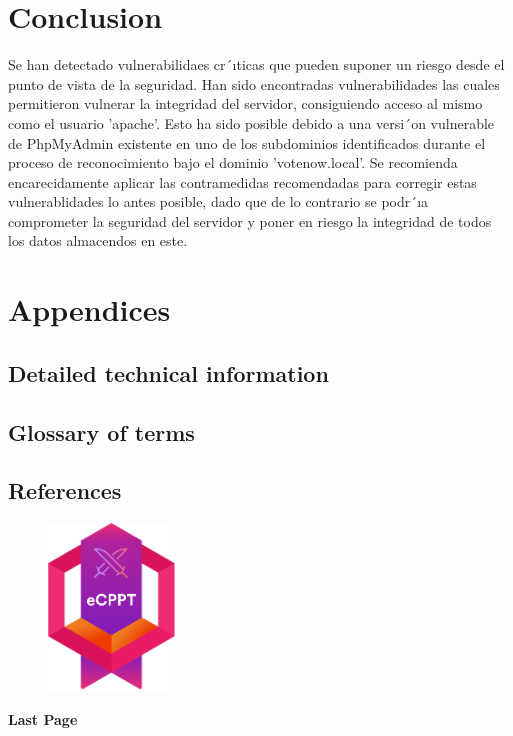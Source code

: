 \documentclass[a4paper]{article} %
\begin{document}
    \clearpage

    \section{Conclusion}
    Se han detectado vulnerabilidaes cr´ıticas que pueden suponer un riesgo desde el punto de vista de la seguridad. Han sido encontradas vulnerabilidades las cuales permitieron vulnerar la integridad del servidor, consiguiendo acceso al mismo como el usuario ’apache’.
    Esto ha sido posible debido a una versi´on vulnerable de PhpMyAdmin existente en uno de los subdominios
    identificados durante el proceso de reconocimiento bajo el dominio ’votenow.local’.
    Se recomienda encarecidamente aplicar las contramedidas recomendadas para corregir estas vulnerablidades lo
    antes posible, dado que de lo contrario se podr´ıa comprometer la seguridad del servidor y poner en riesgo la
    integridad de todos los datos almacendos en este.

    \clearpage

    \section{Appendices}
    \subsection{Detailed technical information}
    \subsection{Glossary of terms}
    \subsection{References}

    \null
    \vfill
    \hfill
    \begin{figure}[h]
        \centering
        \includegraphics[width=0.30\textwidth]{images/logoPortada.png}
    \end{figure}
    \hfill
    \null
    \vfill
    \null

    \null
    \hfill
    \textbf{\Huge Last Page}
    \hfill
    \null
    \vfill
    \vfill
    \null
    
\end{document}
